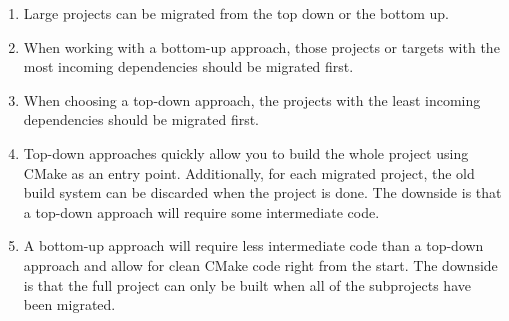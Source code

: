 

\begin{enumerate}
\item 
Large projects can be migrated from the top down or the bottom up.

\item
When working with a bottom-up approach, those projects or targets with the most incoming dependencies should be migrated first.

\item 
When choosing a top-down approach, the projects with the least incoming dependencies should be migrated first.

\item 
Top-down approaches quickly allow you to build the whole project using CMake as an entry point. Additionally, for each migrated project, the old build system can be discarded when the project is done. The downside is that a top-down approach will require some intermediate code.

\item 
A bottom-up approach will require less intermediate code than a top-down approach and allow for clean CMake code right from the start. The downside is that the full project can only be built when all of the subprojects have been migrated.
\end{enumerate}